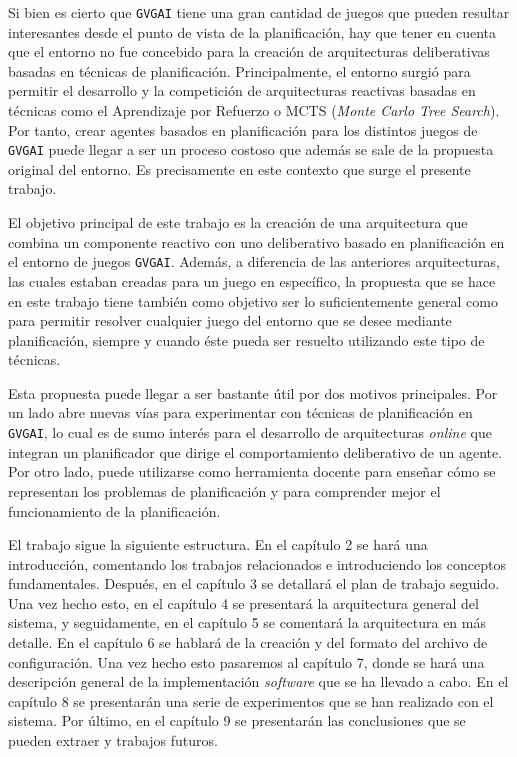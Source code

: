 Si bien es cierto que \texttt{GVGAI} tiene una gran cantidad de juegos que pueden resultar
interesantes desde el punto de vista de la planificación, hay que tener en cuenta que el entorno
no fue concebido para la creación de arquitecturas deliberativas basadas en técnicas de planificación.
Principalmente, el entorno surgió para permitir el desarrollo y la competición de arquitecturas reactivas basadas en
técnicas como el Aprendizaje por Refuerzo o MCTS (\textit{Monte Carlo Tree Search}). Por tanto, crear agentes
basados en planificación para los distintos juegos de \texttt{GVGAI} puede llegar a ser un proceso costoso que además
se sale de la propuesta original del entorno. Es precisamente en este contexto que surge el presente trabajo.

El objetivo principal de este trabajo es la creación de una arquitectura que combina un componente
reactivo con uno deliberativo basado en planificación en el entorno de juegos \texttt{GVGAI}. Además,
a diferencia de las anteriores arquitecturas, las cuales estaban creadas para un juego en específico,
la propuesta que se hace en este trabajo tiene también como objetivo ser lo suficientemente general como
para permitir resolver cualquier juego del entorno que se desee mediante planificación, siempre y
cuando éste pueda ser resuelto utilizando este tipo de técnicas.

Esta propuesta puede llegar a ser bastante útil por dos motivos principales. Por un
lado abre nuevas vías para experimentar con técnicas de planificación en \texttt{GVGAI}, lo cual es de
sumo interés para el desarrollo de arquitecturas \textit{online} que integran un planificador que
dirige el comportamiento deliberativo de un agente. Por otro lado, puede utilizarse como herramienta
docente para enseñar cómo se representan los problemas de planificación y para comprender mejor el funcionamiento
de la planificación.

El trabajo sigue la siguiente estructura. En el capítulo 2 se hará
una introducción, comentando los trabajos relacionados e introduciendo los conceptos
fundamentales. Después, en el capítulo 3 se detallará el plan de trabajo seguido. Una vez hecho esto,
en el capítulo 4 se presentará la arquitectura general del sistema, y seguidamente, en el
capítulo 5 se comentará la arquitectura en más detalle. En el capítulo 6 se hablará de la creación
y del formato del archivo de configuración. Una vez hecho esto pasaremos al capítulo 7,
donde se hará una descripción general de la implementación \textit{software} que se
ha llevado a cabo. En el capítulo 8 se presentarán una serie de experimentos que
se han realizado con el sistema. Por último, en el capítulo 9 se presentarán las
conclusiones que se pueden extraer y trabajos futuros.